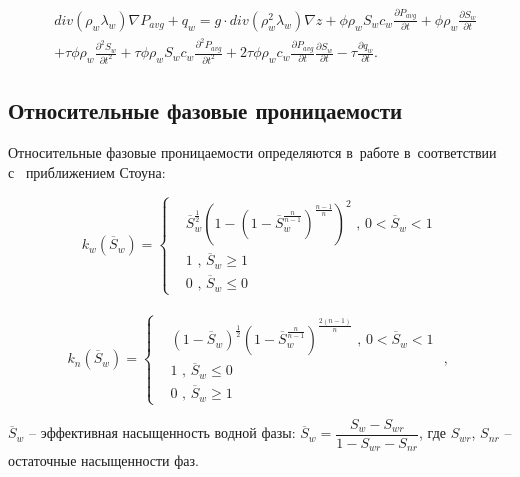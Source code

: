 \begin{equation} \label{eq:mod_saturation}
 \begin{aligned}
  & div (\rho_w\lambda_w) \nabla P_{avg} + q_w = g \cdot div (\rho_w^2\lambda_w) \nabla z + \phi \rho_w S_w c_w  \frac{\partial P_{avg}}{\partial t}
  + \phi \rho_w \frac{\partial S_w}{\partial t} \\
  & + \tau \phi \rho_w \frac{\partial^2 S_w}{\partial t^2} + \tau \phi \rho_w S_w c_w \frac{\partial^2 P_{avg}}{\partial t^2}
  + 2 \tau \phi \rho_w c_w \frac{\partial P_{avg}}{\partial t} \frac{\partial S_w}{\partial t} - \tau \frac{\partial q_w}{\partial t}.
 \end{aligned}
\end{equation}

\subsection{Относительные фазовые проницаемости}
Относительные фазовые проницаемости определяются в~работе в~соответствии с~
приближением Стоуна\cite{Aziz-Settari}:

\begin{equation*}
  k_{w}(\overline{S}_w)=
  \begin{cases}
  &\overline{S}_w^\frac{1}{2} \left( 1-\left( 1-\overline{S}_w^\frac{n}{n-1} \right) ^\frac{n-1}{n} \right) ^2
  \text{ , $0<\overline{S}_w<1$}\\
  &1 \text{ , $\overline{S}_w\ge 1$}\\
  &0 \text{ , $\overline{S}_w\le 0$}
\end{cases} 
\end{equation*}
\\
\begin{equation*}
  k_{n}(\overline{S}_w)=
  \begin{cases}
  &(1-\overline{S}_w)^\frac{1}{2} \left(1-\overline{S}_w^\frac{n}{n-1} \right) ^\frac{2(n-1)}{n}
  \text{ , $0<\overline{S}_w<1$}\\
  &1 \text{ , $\overline{S}_w\le 0$}\\
  &0 \text{ , $\overline{S}_w\ge 1$}
  \end{cases}\text { , }
\end{equation*}

$\overline{S}_w$ -- эффективная насыщенность водной фазы:
$\overline{S}_w={\dfrac{S_w-S_{wr}}{1-S_{wr}-S_{nr}}}$, где $S_{wr}$,
$S_{nr}$ -- остаточные насыщенности фаз.